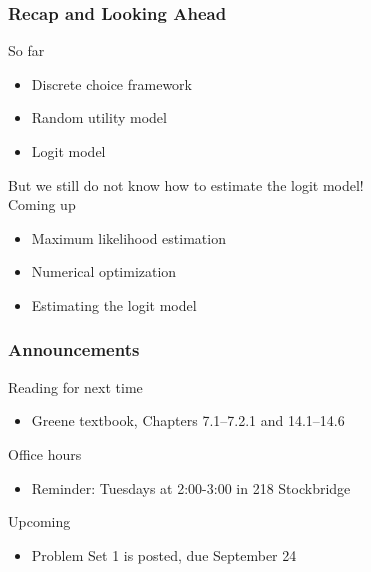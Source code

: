 \documentclass{beamer}
\begin{document}
\begin{frame}\frametitle{Recap and Looking Ahead}
    So far
    \begin{itemize}
        \item Discrete choice framework
        \item Random utility model
        \item Logit model
    \end{itemize}
    \vspace{3ex}
    But we still do not know how to estimate the logit model! \\
    \vspace{3ex}
    Coming up
    \begin{itemize}
        \item Maximum likelihood estimation
        \item Numerical optimization
        \item Estimating the logit model
    \end{itemize}
\end{frame}

\begin{frame}\frametitle{Announcements}
    Reading for next time
    \begin{itemize}
        \item Greene textbook, Chapters 7.1--7.2.1 and 14.1--14.6
    \end{itemize}
    \vspace{3ex}
    Office hours
    \begin{itemize}
    	\item Reminder: Tuesdays at 2:00-3:00 in 218 Stockbridge
    \end{itemize}
    \vspace{3ex}
    Upcoming
    \begin{itemize}
        \item Problem Set 1 is posted, due September 24
    \end{itemize}
\end{frame}
\end{document}
